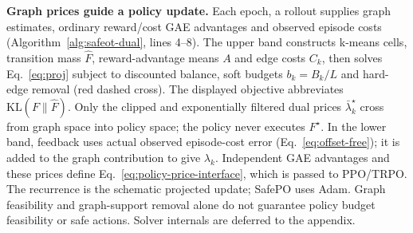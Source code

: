 \textbf{Graph prices guide a policy update.} Each epoch, a rollout supplies graph estimates, ordinary reward/cost GAE advantages and observed episode costs (Algorithm~\ref{alg:safeot-dual}, lines 4--8). The upper band constructs k-means cells, transition mass $\hat F$, reward-advantage means $A$ and edge costs $C_k$, then solves Eq.~\eqref{eq:proj} subject to discounted balance, soft budgets $b_k=B_k/L$ and hard-edge removal (red dashed cross). The displayed objective abbreviates $\mathrm{KL}(F\|\hat F)$. Only the clipped and exponentially filtered dual prices $\bar\lambda_k^\star$ cross from graph space into policy space; the policy never executes $F^\star$. In the lower band, feedback uses actual observed episode-cost error (Eq.~\eqref{eq:offset-free}); it is added to the graph contribution to give $\lambda_k$. Independent GAE advantages and these prices define Eq.~\eqref{eq:policy-price-interface}, which is passed to PPO/TRPO. The recurrence is the schematic projected update; SafePO uses Adam. Graph feasibility and graph-support removal alone do not guarantee policy budget feasibility or safe actions. Solver internals are deferred to the appendix.
